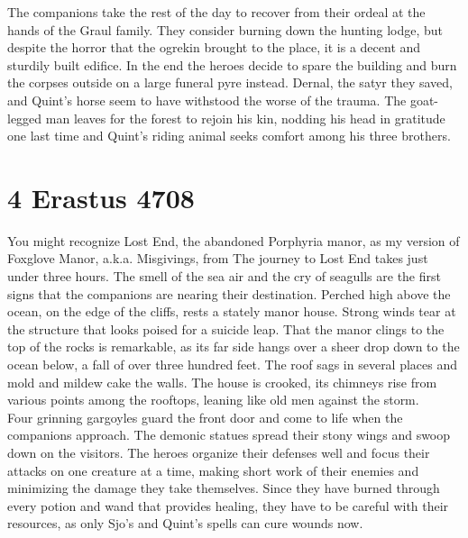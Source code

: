 The companions take the rest of the day to recover from their ordeal at the hands of the Graul family. They consider burning down the hunting lodge, but despite the horror that the ogrekin brought to the place, it is a decent and sturdily built edifice. In the end the heroes decide to spare the building and burn the corpses outside on a large funeral pyre instead. Dernal, the satyr they saved, and Quint's horse seem to have withstood the worse of the trauma. The goat-legged man leaves for the forest to rejoin his kin, nodding his head in gratitude one last time and Quint's riding animal seeks comfort among his three brothers.\\

\section{4 Erastus 4708}

You might recognize Lost End, the abandoned Porphyria manor, as my version of Foxglove Manor, a.k.a. Misgivings, from The journey to Lost End takes just under three hours. The smell of the sea air and the cry of seagulls are the first signs that the companions are nearing their destination. Perched high above the ocean, on the edge of the cliffs, rests a stately manor house. Strong winds tear at the structure that looks poised for a suicide leap. That the manor clings to the top of the rocks is remarkable, as its far side hangs over a sheer drop down to the ocean below, a fall of over three hundred feet. The roof sags in several places and mold and mildew cake the walls. The house is crooked, its chimneys rise from various points among the rooftops, leaning like old men against the storm.\\

Four grinning gargoyles guard the front door and come to life when the companions approach. The demonic statues spread their stony wings and swoop down on the visitors. The heroes organize their defenses well and focus their attacks on one creature at a time, making short work of their enemies and minimizing the damage they take themselves. Since they have burned through every potion and wand that provides healing, they have to be careful with their resources, as only Sjo's and Quint's spells can cure wounds now.\\

